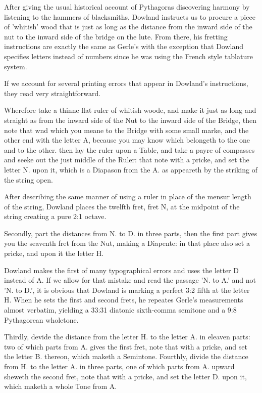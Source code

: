 After giving the usual historical account of Pythagoras discovering harmony by
listening to the hammers of blacksmiths, Dowland instructs us to procure a piece
of 'whitish' wood that is just as long as the distance from the inward
side of the nut to the inward side of the bridge on the lute.  From there, his
fretting instructions are exactly the same as Gerle's with the exception that
Dowland specifies letters instead of numbers since he was using the French style
tablature system.

If we account for several printing
errors that appear in Dowland's instructions, they read very
straightforward.
\begin{blocks}
Wherefore take a thinne flat ruler of whitish woode, and make it just as long
and straight as from the inward side of the Nut to the inward side of the
Bridge, then note that wnd which you meane to the Bridge with some small marke,
and the other end with the letter A, because you may know which belongeth to the
one and to the other. then lay the ruler upon a Table, and take a payre of
compasses and seeke out the just middle of the Ruler: that note with a pricke,
and set the letter N. upon it, which is a Diapason from the A. as appeareth by
the striking of the string open.
\end{blocks}
After describing the same manner of using a ruler in place of the mensur length
of the string, Dowland places the twelfth fret, fret N, at the midpoint of the
string creating a pure 2:1 octave.
\begin{blocks}
Secondly, part the distances from N. to D. in three parts, then the first part
gives you the seaventh fret from the Nut, making a Diapente: in that place also
set a pricke, and upon it the letter H.
\end{blocks}
Dowland makes the first of many typographical errors and uses the letter D
instead of A. If we allow for that mistake and read the passage 'N. to
A.' and not 'N. to D.', it is obvious that Dowland is marking a
perfect 3:2 fifth at the letter H.  When he sets the first and
second frets, he repeates Gerle's measurements almost verbatim,
yielding a 33:31 diatonic sixth-comma semitone and a 9:8 Pythagorean wholetone.
\begin{blocks}
Thirdly, devide the distance from the letter H. to the letter A. in eleaven
parts: two of which parts from A. gives the first fret, note that with a pricke,
and set the letter B. thereon, which maketh a Semintone.  Fourthly, divide the
distance from H. to the letter A. in three parts, one of which parts from A.
upward sheweth the second fret, note that with a pricke, and set the letter D.
upon it, which maketh a whole Tone from A.
\end{blocks}
